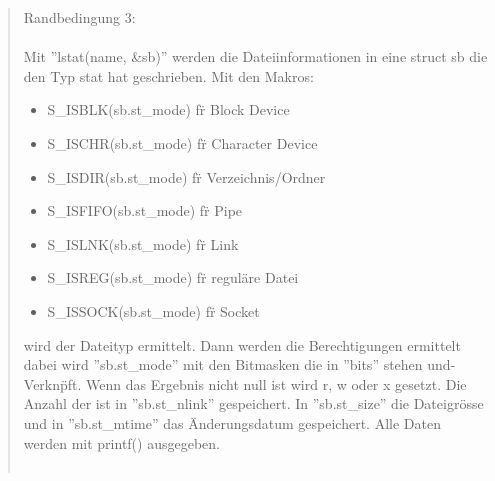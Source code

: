 \begin{quote}
			Randbedingung 3:\\ \\
			\tiny
			Mit ''lstat(name, \&sb)'' werden die Dateiinformationen in eine struct sb die den Typ stat hat geschrieben. Mit den Makros:\\
			\begin{itemize}
				\item S\_ISBLK(sb.st\_mode) f\"r Block Device\\
				\item S\_ISCHR(sb.st\_mode) f\"r Character Device\\
				\item S\_ISDIR(sb.st\_mode) f\"r Verzeichnis/Ordner\\
				\item S\_ISFIFO(sb.st\_mode) f\"r Pipe\\
				\item S\_ISLNK(sb.st\_mode) f\"r Link\\
				\item S\_ISREG(sb.st\_mode) f\"r regul\"are Datei\\
				\item S\_ISSOCK(sb.st\_mode) f\"r Socket\\
			\end{itemize}
			wird der Dateityp ermittelt. Dann werden die Berechtigungen ermittelt dabei wird ''sb.st\_mode'' mit den Bitmasken die in ''bits'' stehen und-Verkn\"pft.
			\tiny
			Wenn das Ergebnis nicht null ist wird r, w oder x gesetzt.
			Die Anzahl der ist in ''sb.st\_nlink'' gespeichert. In ''sb.st\_size'' die Dateigr\"osse und in ''sb.st\_mtime'' das \"Anderungsdatum gespeichert. Alle Daten werden mit printf() ausgegeben.\\ \\
			

\end{quote}
